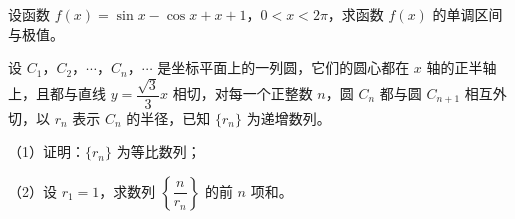 \endgroup
\begin{question}
设函数 $f(x)=\sin x-\cos x+x+1$，$0<x<2\pi$，求函数 $f(x)$ 的单调区间与极值。

\Needspace{0.4\textheight}
\end{question}
\begingroup
\renewenvironment{question}{\Needspace{0.5\textheight}}{}
\begin{question}
设 $C_1$，$C_2$，$\cdots$，$C_n$，$\cdots$ 是坐标平面上的一列圆，它们的圆心都在 $x$ 轴的正半轴上，且都与直线 $y=\dfrac{\sqrt3}3x$ 相切，对每一个正整数 $n$，圆 $C_n$ 都与圆 $C_{n+1}$ 相互外切，以 $r_n$ 表示 $C_n$ 的半径，已知 $\{r_n\}$ 为递增数列。

（1）证明：$\{r_n\}$ 为等比数列；

（2）设 $r_1=1$，求数列 $\left\{\dfrac{n}{r_n}\right\}$ 的前 $n$ 项和。
\nopagebreak[4]
\begin{center}\end{center}
\nopagebreak[4]

\end{question}
\endgroup